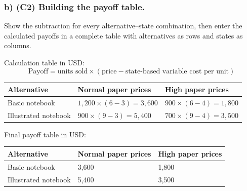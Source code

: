 \subsubsection*{b) \textbf{(C2)} Building the payoff table.}
\label{subsec:problem5-school-notebook-printing-c2}
Show the subtraction for every alternative--state combination, then enter the calculated payoffs in a complete table with alternatives as rows and states as columns.

Calculation table in USD:
\[
\text{Payoff}=\text{units sold}\times(\text{price}-\text{state-based variable cost per unit})
\]
\begin{center}
\small
\begin{tabular}{lll}
\toprule
Alternative & Normal paper prices & High paper prices \\
\midrule
Basic notebook & $1{,}200 \times (6 - 3) = 3{,}600$ & $900 \times (6 - 4) = 1{,}800$ \\
Illustrated notebook & $900 \times (9 - 3) = 5{,}400$ & $700 \times (9 - 4) = 3{,}500$ \\
\bottomrule
\end{tabular}
\end{center}

Final payoff table in USD:
\begin{center}
\begin{tabular}{lll}
\toprule
Alternative & Normal paper prices & High paper prices \\
\midrule
Basic notebook & 3{,}600 & 1{,}800 \\
Illustrated notebook & 5{,}400 & 3{,}500 \\
\bottomrule
\end{tabular}
\end{center}
